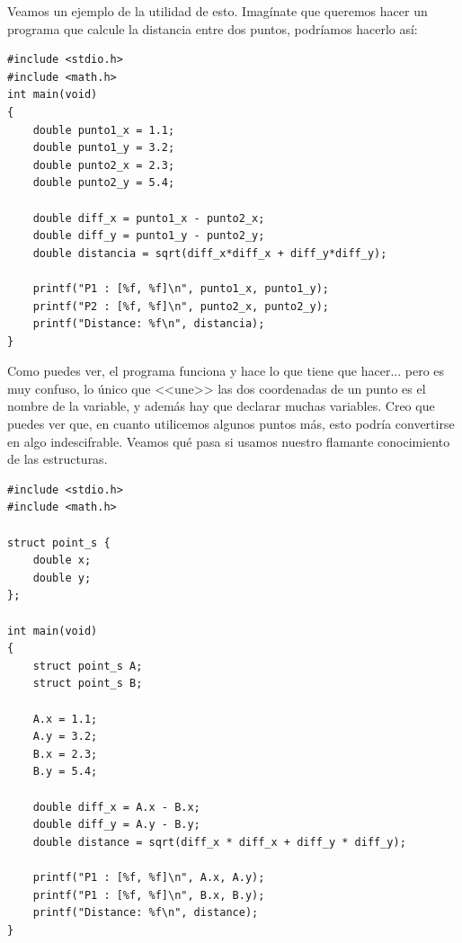 \documentclass[a4paper]{article}
\begin{document}
Veamos un ejemplo de la utilidad de esto. Imagínate que queremos hacer un
programa que calcule la distancia entre dos puntos, podríamos hacerlo así:


\noindent
\begin{minipage}[H]{\linewidth}
\mbox{}
\begin{lstlisting}[style=C,
caption={Ejemplo de resolución de distancia entre puntos},
label={lst:pointNoStruct}]
#include <stdio.h>
#include <math.h>
int main(void)
{
    double punto1_x = 1.1;
    double punto1_y = 3.2;
    double punto2_x = 2.3;
    double punto2_y = 5.4;

    double diff_x = punto1_x - punto2_x;
    double diff_y = punto1_y - punto2_y;
    double distancia = sqrt(diff_x*diff_x + diff_y*diff_y);

    printf("P1 : [%f, %f]\n", punto1_x, punto1_y);
    printf("P2 : [%f, %f]\n", punto2_x, punto2_y);
    printf("Distance: %f\n", distancia);
}
\end{lstlisting}
\end{minipage}


Como puedes ver, el programa funciona y hace lo que tiene que hacer... pero
es muy confuso, lo único que <<une>> las dos coordenadas de un punto es el
nombre de la variable, y además hay que declarar muchas variables. Creo que
puedes ver que, en cuanto utilicemos algunos puntos más, esto podría convertirse
en algo indescifrable. Veamos qué pasa si usamos nuestro flamante conocimiento
de las estructuras.


\noindent
\begin{minipage}[H]{\linewidth}
\mbox{}
\begin{lstlisting}[style=C,
caption={Ejemplo de resolución de distancia entre puntos usando estructuras},
label={lst:pointStruct}]
#include <stdio.h>
#include <math.h>

struct point_s {
    double x;
    double y;
};

int main(void)
{
    struct point_s A;
    struct point_s B;

    A.x = 1.1;
    A.y = 3.2;
    B.x = 2.3;
    B.y = 5.4;

    double diff_x = A.x - B.x;
    double diff_y = A.y - B.y;
    double distance = sqrt(diff_x * diff_x + diff_y * diff_y);

    printf("P1 : [%f, %f]\n", A.x, A.y);
    printf("P1 : [%f, %f]\n", B.x, B.y);
    printf("Distance: %f\n", distance);
}
\end{lstlisting}
\end{minipage}
\end{document}
